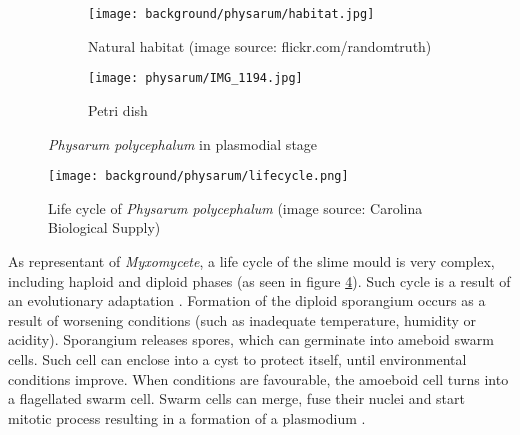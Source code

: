 \begin{figure}
  \centering
  \begin{subfigure}{0.45\textwidth}
    \centering
    \texttt{[image: background/physarum/habitat.jpg]}
    \caption{Natural habitat (image source: flickr.com/randomtruth)}
    \label{figure:bp_habitat}
  \end{subfigure}
  \begin{subfigure}{0.45\textwidth}
    \centering
    \texttt{[image: physarum/IMG\_1194.jpg]}
    \caption{Petri dish}
    \label{figure:bp_petri}
  \end{subfigure}
  \caption{\textit{Physarum polycephalum} in plasmodial stage}
\end{figure}

\begin{figure}
  \centering
  \texttt{[image: background/physarum/lifecycle.png]}
  \caption{Life cycle of \textit{Physarum polycephalum} (image source: Carolina Biological Supply)}
  \label{figure:bp_lifecycle}
\end{figure}

As representant of \textit{Myxomycete}, a life cycle of the slime mould is very complex, including haploid and diploid phases (as seen in figure \ref{figure:bp_lifecycle}). Such cycle is a result of an evolutionary adaptation \cite{stephenson1994myxomycetes}. Formation of the diploid sporangium occurs as a result of worsening conditions (such as inadequate temperature, humidity or acidity). Sporangium releases spores, which can germinate into ameboid swarm cells. Such cell can enclose into a cyst to protect itself, until environmental conditions improve. When conditions are favourable, the amoeboid cell turns into a flagellated swarm cell. Swarm cells can merge, fuse their nuclei and start mitotic process resulting in a formation of a plasmodium \cite{jones2015pattern}.

